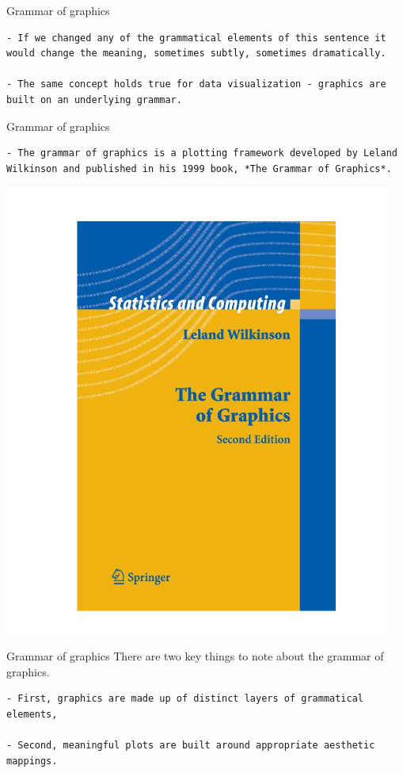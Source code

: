\documentclass[
  ignorenonframetext,
]{beamer}
\begin{document}
\begin{frame}[fragile]{Grammar of graphics}
\label{grammar-of-graphics}
\begin{verbatim}
- If we changed any of the grammatical elements of this sentence it would change the meaning, sometimes subtly, sometimes dramatically.

- The same concept holds true for data visualization - graphics are built on an underlying grammar. 
\end{verbatim}
\end{frame}

\begin{frame}[fragile]{Grammar of graphics}
\label{grammar-of-graphics-1}
\begin{verbatim}
- The grammar of graphics is a plotting framework developed by Leland Wilkinson and published in his 1999 book, *The Grammar of Graphics*. 
\end{verbatim}

\includegraphics{../images/im121.png}
\end{frame}

\begin{frame}[fragile]{Grammar of graphics}
\label{grammar-of-graphics-2}
There are two key things to note about the grammar of graphics.

\begin{verbatim}
- First, graphics are made up of distinct layers of grammatical elements, 

- Second, meaningful plots are built around appropriate aesthetic mappings. 
\end{verbatim}
\end{frame}
\end{document}
